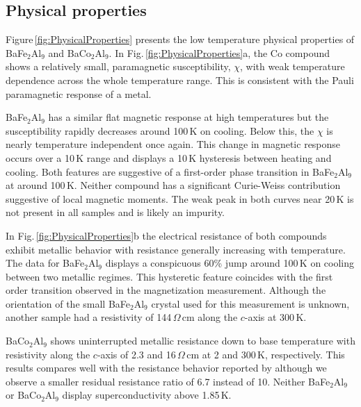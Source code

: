 \documentclass[journal=cmatex,manuscript=article]{achemso}
\begin{document}
\subsection{Physical properties}
\label{sec:Results_PhysicalProperties}

\label{sec:Results_chiT}
Figure\,\ref{fig:PhysicalProperties} presents the low temperature physical properties of BaFe$_2$Al$_9$ and BaCo$_2$Al$_9$. In Fig.\,\ref{fig:PhysicalProperties}a, the Co compound shows a relatively small, paramagnetic susceptibility, $\chi$, with weak temperature dependence across the whole temperature range. This is consistent with the Pauli paramagnetic response of a metal.\cite{Blundell2001_MagnetismInCondensedMatter,Kittel2004_SolidStatePhysics} 

BaFe$_2$Al$_9$ has a similar flat magnetic response at high temperatures but the susceptibility rapidly decreases around 100\,K on cooling. Below this, the $\chi$ is nearly temperature independent once again. This change in magnetic response occurs over a 10\,K range and displays a 10\,K hysteresis between heating and cooling. Both features are suggestive of a first-order phase transition in BaFe$_2$Al$_9$ at around 100\,K. Neither compound has a significant Curie-Weiss contribution suggestive of local magnetic moments. The weak peak in both curves near 20\,K is not present in all samples and is likely an impurity.

\label{sec:Results_RT}
In Fig.\,\ref{fig:PhysicalProperties}b the electrical resistance of both compounds exhibit metallic behavior with resistance generally increasing with temperature. The data for BaFe$_2$Al$_9$ displays a conspicuous 60\% jump around 100\,K on cooling between two metallic regimes. This hysteretic feature coincides with the first order transition observed in the magnetization measurement. Although the orientation of the small BaFe$_2$Al$_9$ crystal used for this measurement is unknown, another sample had a resistivity of 144\,\textmu$\Omega$\,cm along the $c$-axis at 300\,K.

BaCo$_2$Al$_9$ shows uninterrupted metallic resistance down to base temperature with resistivity along the $c$-axis of 2.3 and 16\,\textmu$\Omega$\,cm at 2 and 300\,K, respectively. This results compares well with the resistance behavior reported by \citeauthor{Ryzynska2020_SingleCrystalPropertiesMCo2Al9} although we observe a smaller residual resistance ratio of 6.7 instead of 10.\cite{Ryzynska2020_SingleCrystalPropertiesMCo2Al9} Neither BaFe$_2$Al$_9$ or BaCo$_2$Al$_9$ display superconductivity above 1.85\,K.
\end{document}
